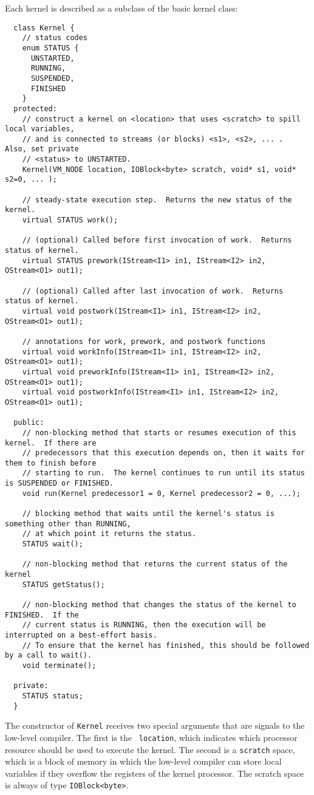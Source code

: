 Each kernel is described as a subclass of the basic kernel class:
{\small
\begin{verbatim}
  class Kernel {
    // status codes
    enum STATUS {
      UNSTARTED,
      RUNNING,
      SUSPENDED,
      FINISHED
    }
  protected:
    // construct a kernel on <location> that uses <scratch> to spill local variables,
    // and is connected to streams (or blocks) <s1>, <s2>, ... .  Also, set private 
    // <status> to UNSTARTED.
    Kernel(VM_NODE location, IOBlock<byte> scratch, void* s1, void* s2=0, ... );

    // steady-state execution step.  Returns the new status of the kernel.
    virtual STATUS work();

    // (optional) Called before first invocation of work.  Returns status of kernel.
    virtual STATUS prework(IStream<I1> in1, IStream<I2> in2, OStream<O1> out1);

    // (optional) Called after last invocation of work.  Returns status of kernel.
    virtual void postwork(IStream<I1> in1, IStream<I2> in2, OStream<O1> out1);

    // annotations for work, prework, and postwork functions
    virtual void workInfo(IStream<I1> in1, IStream<I2> in2, OStream<O1> out1);
    virtual void preworkInfo(IStream<I1> in1, IStream<I2> in2, OStream<O1> out1);
    virtual void postworkInfo(IStream<I1> in1, IStream<I2> in2, OStream<O1> out1);
   
  public:
    // non-blocking method that starts or resumes execution of this kernel.  If there are 
    // predecessors that this execution depends on, then it waits for them to finish before 
    // starting to run.  The kernel continues to run until its status is SUSPENDED or FINISHED.
    void run(Kernel predecessor1 = 0, Kernel predecessor2 = 0, ...);

    // blocking method that waits until the kernel's status is something other than RUNNING,
    // at which point it returns the status.
    STATUS wait();

    // non-blocking method that returns the current status of the kernel
    STATUS getStatus();

    // non-blocking method that changes the status of the kernel to FINISHED.  If the
    // current status is RUNNING, then the execution will be interrupted on a best-effort basis.
    // To ensure that the kernel has finished, this should be followed by a call to wait().
    void terminate();

  private:
    STATUS status;
  }  
\end{verbatim}}
The constructor of {\tt Kernel} receives two special arguments that
are signals to the low-level compiler.  The first is the {\tt
location}, which indicates which processor resource should be used to
execute the kernel.  The second is a {\tt scratch} space, which is a
block of memory in which the low-level compiler can store local
variables if they overflow the registers of the kernel processor.  The
scratch space is always of type {\tt IOBlock<byte>}.  

